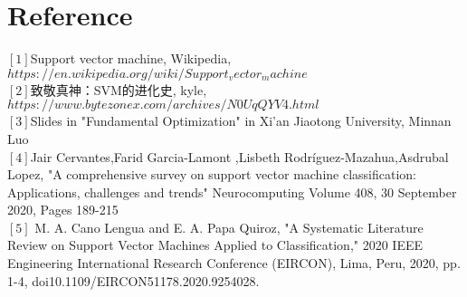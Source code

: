 \documentclass{article}
\begin{document}
\section*{Reference}
\noindent $\left[ 1 \right]$Support vector machine, Wikipedia, $https://en.wikipedia.org/wiki/Support_vector_machine$\\
$\left[ 2 \right]$致敬真神：SVM的进化史, kyle, $https://www.bytezonex.com/archives/N0UqQYV4.html$\\
$\left[ 3 \right]$Slides in "Fundamental Optimization" in Xi'an Jiaotong University, Minnan Luo\\
$\left[ 4 \right]$Jair Cervantes,Farid Garcia-Lamont ,Lisbeth Rodríguez-Mazahua,Asdrubal Lopez, "A comprehensive survey on support vector machine classification: Applications, challenges and trends" Neurocomputing Volume 408, 30 September 2020, Pages 189-215\\
$\left[ 5 \right]$ M. A. Cano Lengua and E. A. Papa Quiroz, "A Systematic Literature Review on Support Vector Machines Applied to Classification," 2020 IEEE Engineering International Research Conference (EIRCON), Lima, Peru, 2020, pp. 1-4, doi10.1109/EIRCON51178.2020.9254028.
\end{document}
